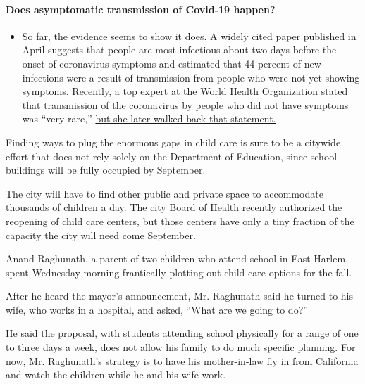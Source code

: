 \begin{itemize}
{  \paragraph{Does asymptomatic transmission of Covid-19
  happen?}\label{does-asymptomatic-transmission-of-covid-19-happen}}

  \begin{itemize}
  \tightlist
  \item
    So far, the evidence seems to show it does. A widely cited
    \href{https://www.nature.com/articles/s41591-020-0869-5}{paper}
    published in April suggests that people are most infectious about
    two days before the onset of coronavirus symptoms and estimated that
    44 percent of new infections were a result of transmission from
    people who were not yet showing symptoms. Recently, a top expert at
    the World Health Organization stated that transmission of the
    coronavirus by people who did not have symptoms was ``very rare,''
    \href{https://www.nytimes.com/2020/06/09/world/coronavirus-updates.html?action=click\&pgtype=Article\&state=default\&region=MAIN_CONTENT_3\&context=storylines_faq\#link-1f302e21}{but
    she later walked back that statement.}
  \end{itemize}
\end{itemize}

Finding ways to plug the enormous gaps in child care is sure to be a
citywide effort that does not rely solely on the Department of
Education, since school buildings will be fully occupied by September.

The city will have to find other public and private space to accommodate
thousands of children a day. The city Board of Health recently
\href{https://ny.chalkbeat.org/2020/7/7/21316621/nyc-preschools-can-reopen}{authorized
the reopening of child care centers}, but those centers have only a tiny
fraction of the capacity the city will need come September.

Anand Raghunath, a parent of two children who attend school in East
Harlem, spent Wednesday morning frantically plotting out child care
options for the fall.

After he heard the mayor's announcement, Mr. Raghunath said he turned to
his wife, who works in a hospital, and asked, ``What are we going to
do?''

He said the proposal, with students attending school physically for a
range of one to three days a week, does not allow his family to do much
specific planning. For now, Mr. Raghunath's strategy is to have his
mother-in-law fly in from California and watch the children while he and
his wife work.

